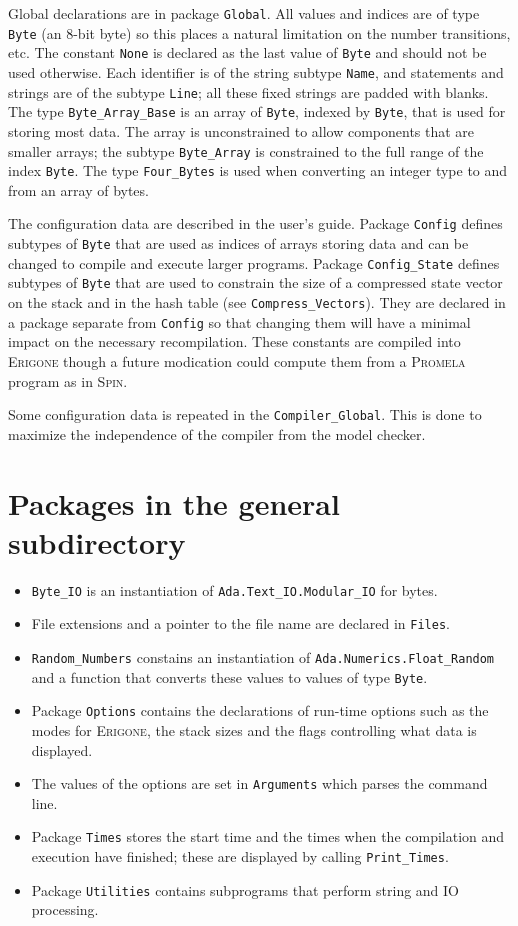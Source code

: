 \documentclass[11pt]{article}
\newcommand*{\prg}{\textsc{Erigone}}
\newcommand*{\spn}{\textsc{Spin}}
\newcommand*{\prm}{\textsc{Promela}}
\newcommand*{\p}[1]{\texttt{#1}}
\begin{document}
Global declarations are in package \p{Global}. All values and indices
are of type \p{Byte} (an 8-bit byte) so this places a natural limitation
on the number transitions, etc. The constant \p{None} is declared as the
last value of \p{Byte} and should not be used otherwise. Each identifier
is of the string subtype \p{Name}, and statements and strings are of the
subtype \p{Line}; all these fixed strings are padded with blanks. The
type \p{Byte\_Array\_Base} is an array of \p{Byte}, indexed by \p{Byte},
that is used for storing most data. The array is unconstrained to allow
components that are smaller arrays; the subtype \p{Byte\_Array} is
constrained to the full range of the index \p{Byte}. The type
\p{Four\_Bytes} is used when converting an integer type to and from an
array of bytes.

The configuration data are described in the user's guide. Package
\p{Config} defines subtypes of \p{Byte} that are used as indices of
arrays storing data and can be changed to compile and execute larger
programs. Package \p{Config\_State} defines subtypes of \p{Byte} that
are used to constrain the size of a compressed state vector on the stack
and in the hash table (see \p{Compress\_Vectors}). They are declared in
a package separate from \p{Config} so that changing them will have a
minimal impact on the necessary recompilation. These constants are
compiled into \prg{} though a future modication could compute them from
a \prm{} program as in \spn{}.

Some configuration data is repeated in the \p{Compiler\_Global}. This is
done to maximize the independence of the compiler from the model
checker.

\section{Packages in the general subdirectory}
\begin{itemize}
\item \p{Byte\_IO} is an instantiation of
\p{Ada.Text\_IO.Modular\_IO} for bytes.
\item File extensions and a pointer to the file name are declared in \p{Files}.
\item \p{Random\_Numbers} constains an instantiation of
\p{Ada.Numerics.Float\_Random} and a function that converts these values to values of
type \p{Byte}.
\item Package \p{Options} contains the declarations of run-time options
such as the modes for \prg{}, the stack sizes and the flags controlling
what data is displayed.
\item The values of the options are set in \p{Arguments} which parses
the command line.
\item Package \p{Times} stores the start time and the times when the
compilation and execution have finished; these are displayed
by calling \p{Print\_Times}.
\item Package \p{Utilities} contains subprograms that perform string and
IO processing.
\end{itemize}
\end{document}
